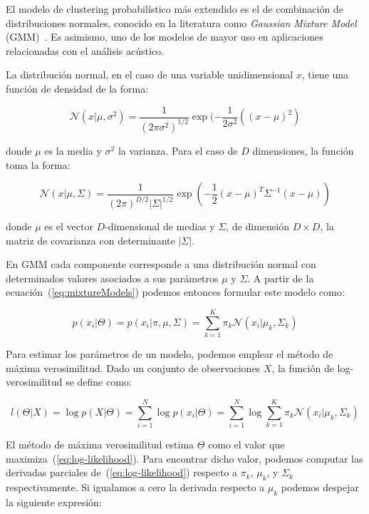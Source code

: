 El modelo de clustering probabilístico más extendido es el de combinación de distribuciones normales, conocido en la literatura como \textit{Gaussian Mixture Model} (GMM)~\cite{Murphy12}.
Es asimismo, uno de los modelos de mayor uso en aplicaciones relacionadas con el análisis acústico. %

La distribución normal, en el caso de una variable unidimensional $x$, tiene una función de densidad de la forma:

\begin{equation}
    \label{eq:singleGaussian}
    \mathcal{N}(x|\mu,\sigma^2)=\frac{1}{(2\pi\sigma^2)^{1/2}}\exp{(-\frac{1}{2\sigma^2}((x-\mu)^2)}
\end{equation}

\noindent
donde $\mu$ es la media y $\sigma^2$ la varianza.
Para el caso de $D$ dimensiones, la función toma la forma:

\begin{equation}
    \label{eq:multidimGaussian}
    \mathcal{N}(x|\mu,\Sigma)=\frac{1}{(2\pi)^{D/2}|\Sigma|^{1/2}}\exp{(-\frac{1}{2}(x-\mu)^T \Sigma^{-1}(x-\mu))}
\end{equation}

\noindent
donde $\mu$ es el vector $D$-dimensional de medias y $\Sigma$, de dimensión $D\times D$, la matriz de covarianza con determinante $|\Sigma|$.

En GMM cada componente corresponde a una distribución normal con determinados valores asociados a sus parámetros $\mu$ y $\Sigma$.
A partir de la ecuación~(\ref{eq:mixtureModels}) podemos entonces formular este modelo como:

\begin{equation}
    \label{eq:GMM}
    p(x_i|\Theta) = p(x_i|\pi,\mu,\Sigma)= \sum_{k=1}^{K}{\pi_k \mathcal{N}(x_i|\mu_k,\Sigma_k)}
\end{equation}

Para estimar los parámetros de un modelo, podemos emplear el método de máxima verosimilitud.
Dado un conjunto de observaciones $X$, la función de log-verosimilitud se define como:

\begin{equation}
    \label{eq:log-likelihood}
    l(\Theta|X) = \log{p(X|\Theta)} = \sum_{i=1}^{N}{\log{p(x_i|\Theta)}} = \sum_{i=1}^{N}{\log{\sum_{k=1}^{K}{\pi_k \mathcal{N}(x_i|\mu_k,\Sigma_k)}}}
\end{equation}

El método de máxima verosimilitud estima $\Theta$ como el valor que maximiza~(\ref{eq:log-likelihood}).
Para encontrar dicho valor, podemos computar las derivadas parciales de~(\ref{eq:log-likelihood}) respecto a $\pi_k$, $\mu_k$, y $\Sigma_k$ respectivamente.
Si igualamos a cero la derivada respecto a $\mu_k$ podemos despejar la siguiente expresión:

